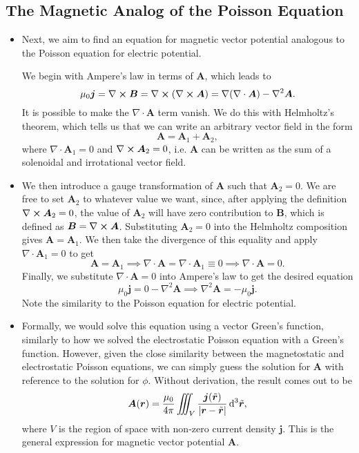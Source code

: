 \documentclass[11pt, a4paper]{article}
\newcommand{\diff}{\mathop{}\!\mathrm{d}} %
\newcommand{\dtr}{\diff^{3} \tilde{\r}}  %
\renewcommand{\vec}[1]{\bm{#1}} %
\renewcommand{\t}[1]{\tilde{#1}} %
\renewcommand{\r}{\vec{r}}
\newcommand{\B}{\vec{B}} %
\newcommand{\A}{\vec{A}} %
\newcommand{\mm}{\mu_{0}}  %
\renewcommand{\j}{\vec{j}}  %
\renewcommand{\div}{\nabla \cdot}
\renewcommand{\curl}{\nabla \cross}
\renewcommand{\grad}{\nabla}
\renewcommand{\laplacian}{\nabla^{2}}
\begin{document}
\subsection{The Magnetic Analog of the Poisson Equation}
\begin{itemize}
	\item Next, we aim to find an equation for magnetic vector potential analogous to the Poisson equation for electric potential. 

    We begin with Ampere's law in terms of $ \A $, which leads to
	\begin{equation*}
		\mm \j = \curl \B = \curl (\curl \A) = \grad (\div \A) - \laplacian \A.
	\end{equation*}
	It is possible to make the $ \div \A $ term vanish. We do this with Helmholtz's theorem, which tells us that we can write an arbitrary vector field in the form
	\begin{equation*}
		\A = \A_{1} + \A_{2},
	\end{equation*}
	where $ \div \A_{1} = 0 $ and $ \curl \A_{2} = 0 $, i.e. $ \A $ can be written as the sum of a solenoidal and irrotational vector field.
	
    \item We then introduce a gauge transformation of $ \A $ such that $ \A_{2} = 0 $. We are free to set $ \A_{2} $ to whatever value we want, since, after applying the definition $ \curl \A_{2} = 0 $, the value of $ \A_{2} $ will have zero contribution to $ \B $, which is defined as $ \B = \curl \A $. Substituting $ \A_{2} = 0 $ into the Helmholtz composition gives $ \A = \A_{1} $. We then take the divergence of this equality and apply $ \div \A_{1} = 0 $ to get
    \begin{equation*}
        \A = \A_{1} \implies \div \A = \div \A_{1} \equiv 0 \implies \div \A = 0.
    \end{equation*}
    Finally, we substitute $ \div \A = 0 $ into Ampere's law to get the desired equation
    \begin{equation*}
        \mm \j = 0 - \laplacian \A \implies \laplacian \A = - \mm \j.
    \end{equation*}
	Note the similarity to the Poisson equation for electric potential.
	
    \item Formally, we would solve this equation using a vector Green's function, similarly to how we solved the electrostatic Poisson equation with a Green's function. However, given the close similarity between the magnetostatic and electrostatic Poisson equations, we can simply guess the solution for $ \A $ with reference to the solution for $ \phi $. Without derivation, the result comes out to be
	\begin{equation*}
		\A(\r) = \frac{\mm}{4\pi} \iiint_{V} \frac{\j(\t{\r})}{\abs{\r - \t{\r}}} \dtr,
	\end{equation*}
	where $ V $ is the region of space with non-zero current density $ \j $. This is the general expression for magnetic vector potential $ \A $. 
	

\end{itemize}
\end{document}
